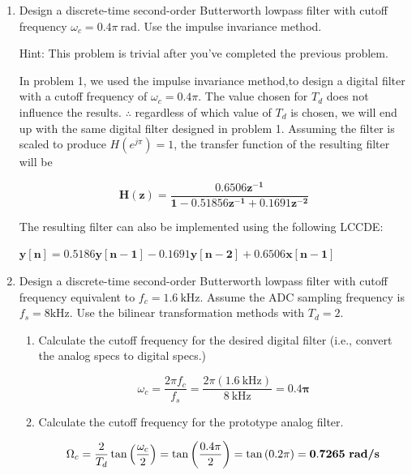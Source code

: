 \documentclass[fleqn]{article}
\begin{document}
\begin{enumerate}[nolistsep]
		\item Design a discrete-time second-order Butterworth lowpass filter with cutoff frequency $\omega_c = 0.4\pi\ \text{rad}$. Use the impulse invariance method.
		
		Hint: This problem is trivial after you've completed the previous problem.
			
		\pagebreak
		In problem 1, we used the impulse invariance method,to design a digital filter with a cutoff frequency of $\omega_c = 0.4\pi$. The value chosen for $T_d$ does not influence the results. $\therefore$ regardless of which value of $T_d$ is chosen, we will end up with the same digital filter designed in problem 1. Assuming the filter is scaled to produce \newline $H(e^{j\pi}) = 1$, the transfer function of the resulting filter will be
		
		\begin{equation*}
			\mathbf{H(z) = \frac{0.6506z^{-1}}{1 - 0.51856z^{-1} + 0.1691z^{-2}}}
		\end{equation*}
		
		The resulting filter can also be implemented using the following LCCDE:
		
		$\mathbf{y[n] = 0.5186y[n-1] - 0.1691y[n-2] + 0.6506x[n-1]}$
		
		\item Design a discrete-time second-order Butterworth lowpass filter with cutoff frequency equivalent to $f_c = 1.6\ \text{kHz}$. Assume the ADC sampling frequency is $f_s = 8 \text{kHz}$. Use the bilinear transformation methods with $T_d = 2$.
		
		\begin{enumerate}
		
			\item Calculate the cutoff frequency for the desired digital filter (i.e., convert the analog specs to digital specs.)
			
			\begin{equation*}
				\omega_c = \frac{2{\pi}f_c}{f_s} = \frac{2{\pi}(1.6\ \text{kHz})}{8\ \text{kHz}} = \mathbf{0.4\pi}
			\end{equation*}
			
			\item Calculate the cutoff frequency for the prototype analog filter.
			
			\begin{equation*}
				\Omega_c = \frac{2}{T_d}\tan{\left(\frac{\omega_c}{2}\right)} = \tan{\left(\frac{0.4\pi}{2}\right)} = \tan{(0.2\pi)} = \mathbf{0.7265\ \text{\textbf{rad/s}}}
			\end{equation*}
			

\end{enumerate}
\end{enumerate}
\end{document}
